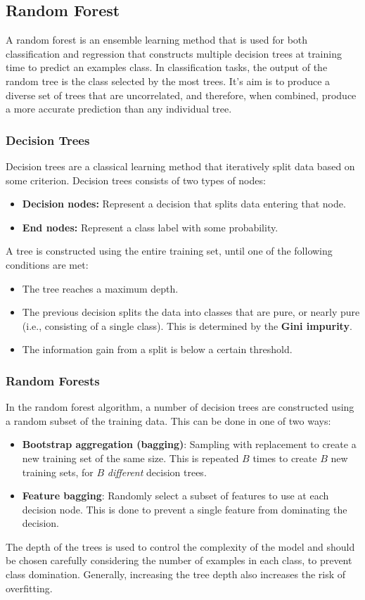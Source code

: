 \documentclass{article}
\begin{document}
\subsection{Random Forest}
A random forest is an ensemble learning method that is used for both
classification and regression that constructs multiple decision trees
at training time to predict an examples class. In classification tasks,
the output of the random tree is the class selected by the most trees.
It's aim is to produce a diverse set of trees that are uncorrelated,
and therefore, when combined, produce a more accurate prediction than
any individual tree.
\subsubsection{Decision Trees}
Decision trees are a classical learning method that iteratively split
data based on some criterion. Decision trees consists of two types of
nodes:
\begin{itemize}
    \item \textbf{Decision nodes:} Represent a decision that splits data entering that node.
    \item \textbf{End nodes:} Represent a class label with some probability.
\end{itemize}
A tree is constructed using the entire training set, until one of the
following conditions are met:
\begin{itemize}
    \item The tree reaches a maximum depth.
    \item The previous decision splits the data into classes that are
          pure, or nearly pure (i.e., consisting of a single class).
          This is determined by the \textbf{Gini impurity}.
    \item The information gain from a split is below a certain
          threshold.
\end{itemize}
\subsubsection{Random Forests}
In the random forest algorithm, a number of decision trees are
constructed using a random subset of the training data. This can be
done in one of two ways:
\begin{itemize}
    \item \textbf{Bootstrap aggregation (bagging)}: Sampling with
          replacement to create a new training set of the same size.
          This is repeated \(B\) times to create \(B\) new training
          sets, for \(B\) \textit{different} decision trees.
    \item \textbf{Feature bagging}: Randomly select a subset of features
          to use at each decision node. This is done to prevent a single
          feature from dominating the decision.
\end{itemize}
The depth of the trees is used to control the complexity of the model
and should be chosen carefully considering the number of examples in
each class, to prevent class domination. Generally, increasing the tree
depth also increases the risk of overfitting.
\end{document}
